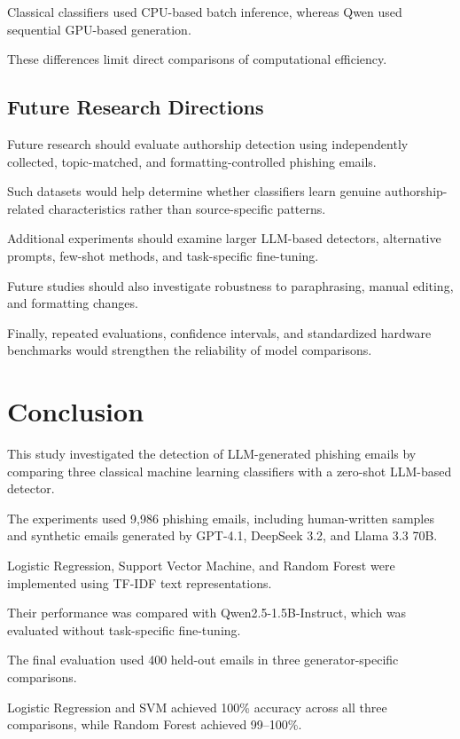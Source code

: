 \documentclass[sigconf,nonacm]{acmart}
\begin{document}
Classical classifiers used CPU-based
batch inference, whereas Qwen used
sequential GPU-based generation.

These differences limit direct
comparisons of computational efficiency.

\subsection{Future Research Directions}

Future research should evaluate
authorship detection using independently
collected, topic-matched, and
formatting-controlled phishing emails.

Such datasets would help determine
whether classifiers learn genuine
authorship-related characteristics
rather than source-specific patterns.

Additional experiments should examine
larger LLM-based detectors, alternative
prompts, few-shot methods, and
task-specific fine-tuning.

Future studies should also investigate
robustness to paraphrasing, manual
editing, and formatting changes.

Finally, repeated evaluations,
confidence intervals, and standardized
hardware benchmarks would strengthen
the reliability of model comparisons.

\section{Conclusion}

This study investigated the detection of
LLM-generated phishing emails by comparing
three classical machine learning classifiers
with a zero-shot LLM-based detector.

The experiments used 9,986 phishing emails,
including human-written samples and
synthetic emails generated by GPT-4.1,
DeepSeek 3.2, and Llama 3.3 70B.

Logistic Regression, Support Vector Machine,
and Random Forest were implemented using
TF-IDF text representations.

Their performance was compared with
Qwen2.5-1.5B-Instruct, which was evaluated
without task-specific fine-tuning.

The final evaluation used 400 held-out
emails in three generator-specific
comparisons.

Logistic Regression and SVM achieved
100\% accuracy across all three comparisons,
while Random Forest achieved 99--100\%.
\end{document}
